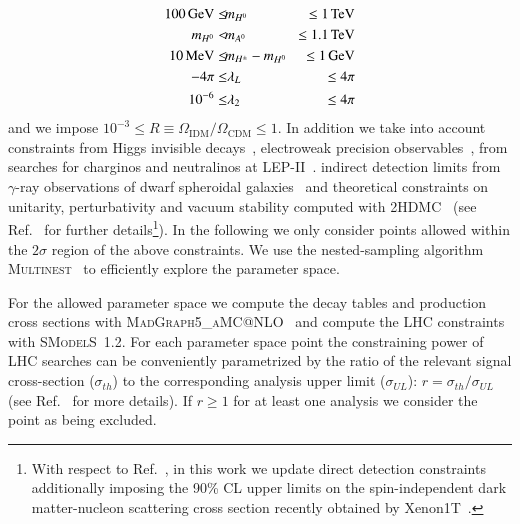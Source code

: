 \documentclass[preprint,number,sort&compress,twocolumn,3p]{elsstyarticle}
\def\bea{\begin{eqnarray}}
\def\eea{\end{eqnarray}}
\newcommand{\MEV}{\ensuremath{\,\textnormal{MeV}}}
\newcommand{\GEV}{\ensuremath{\,\textnormal{GeV}}}
\newcommand{\TEV}{\ensuremath{\,\textnormal{TeV}}}
\newcommand{\smo}{\textsc{SModelS}}
\begin{document}
\bea
100 \GEV \le & \!m_{H^0} \!&\le1\TEV \nonumber \\
m_{H^0} < & \!m_{A^0} \!& \le1.1\TEV \nonumber \\
10\MEV \le & \!m_{H^\pm} -m_{H^0}\!& \le1\GEV \nonumber \\
-4\pi \le &  \lambda_L  & \le 4\pi  \\
10^{-6} \le &  \lambda_2  & \le 4\pi \nonumber
\eea
and we impose $10^{-3} \leq R \equiv \Omega_{\text{IDM}}/\Omega_{\text{CDM}} \leq 1$.
In addition we take into account constraints from Higgs invisible decays~\cite{Aad:2015pla}, 
electroweak precision observables~\cite{Baak:2014ora,Eriksson:2009ws}, from searches for charginos and neutralinos at LEP-II~\cite{Pierce:2007ut,Lundstrom:2008ai}.
indirect detection limits from  $\gamma$-ray observations of dwarf spheroidal galaxies~\cite{Fermi-LAT:2016uux}
and theoretical constraints on unitarity, perturbativity and vacuum stability computed with \textsc{2HDMC}~\cite{Eriksson:2009ws} (see Ref.~\cite{Eiteneuer:2017hoh} for further details\footnote{With respect to Ref.~\cite{Eiteneuer:2017hoh}, in this work we update 
    direct detection constraints additionally imposing the 90\% CL upper limits on the spin-independent
    dark matter-nucleon scattering cross section recently obtained by Xenon1T~\cite{Aprile:2018dbl}.
}).
In the following we only consider points allowed within the $2\sigma$ region of the above constraints.
We use the nested-sampling algorithm \textsc{Multinest}~\cite{Feroz:2008xx,Feroz:2013hea} 
to efficiently explore the parameter space. 

For the allowed parameter space we compute the decay tables and production cross sections
with \textsc{MadGraph5\_aMC@NLO}~\cite{Alwall:2014hca} and compute the LHC constraints with \smo~1.2. 
For each parameter space point the constraining power of LHC
searches can be conveniently parametrized by the ratio of the relevant signal cross-section ($\sigma_{th}$) to the corresponding analysis upper limit ($\sigma_{UL}$): $r = \sigma_{th}/\sigma_{UL}$ (see Ref.~\cite{Ambrogi:2017neo} for more details).
If $r \geq 1$ for at least one analysis we consider the point as being excluded.
\end{document}
